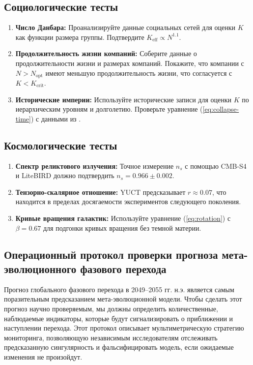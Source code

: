 \documentclass[12pt,a4paper]{article}
\theoremstyle{remark}
\newcommand{\Keff}{K_{\mathrm{eff}}}
\begin{document}
	\subsection{Социологические тесты}
	
	\begin{enumerate}
		\item \textbf{Число Данбара:} Проанализируйте данные социальных сетей для оценки $K$ как функции размера группы. Подтвердите $\Keff \propto N^{1.1}$.
		\item \textbf{Продолжительность жизни компаний:} Соберите данные о продолжительности жизни и размерах компаний. Покажите, что компании с $N > N_{\text{opt}}$ имеют меньшую продолжительность жизни, что согласуется с $K < K_{\text{crit}}$.
		\item \textbf{Исторические империи:} Используйте исторические записи для оценки $K$ по иерархическим уровням и долголетию. Проверьте уравнение (\ref{eq:collapse-time}) с данными из \cite{TurchinNefedov2009}.
	\end{enumerate}
	
	\subsection{Космологические тесты}
	
	\begin{enumerate}
		\item \textbf{Спектр реликтового излучения:} Точное измерение $n_s$ с помощью CMB-S4 и LiteBIRD должно подтвердить $n_s = 0.966 \pm 0.002$.
		\item \textbf{Тензорно-скалярное отношение:} YUCT предсказывает $r \approx 0.07$, что находится в пределах досягаемости экспериментов следующего поколения.
		\item \textbf{Кривые вращения галактик:} Используйте уравнение (\ref{eq:rotation}) с $\beta = 0.67$ для подгонки кривых вращения без темной материи.
	\end{enumerate}
	
	\subsection{Операционный протокол проверки прогноза мета-эволюционного фазового перехода}
	\label{subsec:forecast-protocol}
	
	Прогноз глобального фазового перехода в 2049–2055 гг. н.э. является самым поразительным предсказанием мета-эволюционной модели. Чтобы сделать этот прогноз научно проверяемым, мы должны определить количественные, наблюдаемые индикаторы, которые будут сигнализировать о приближении и наступлении перехода. Этот протокол описывает мультиметрическую стратегию мониторинга, позволяющую независимым исследователям отслеживать предсказанную сингулярность и фальсифицировать модель, если ожидаемые изменения не произойдут.
	
\end{document}

